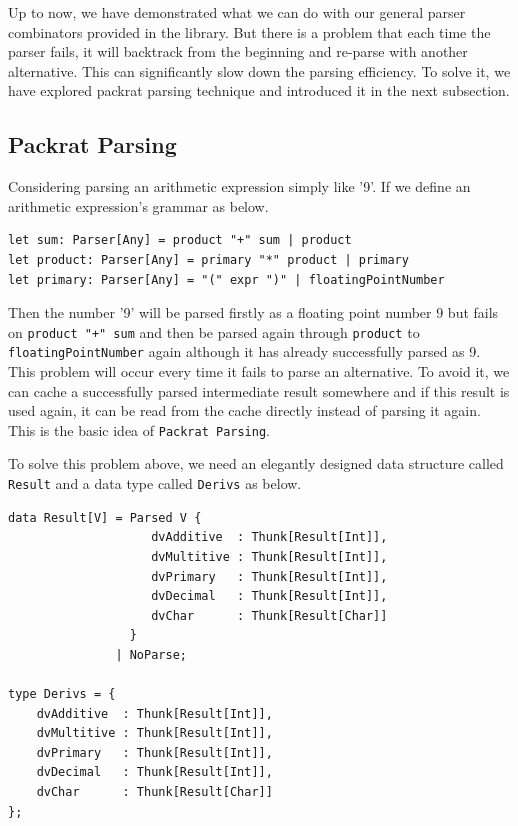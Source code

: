 Up to now, we have demonstrated what we can do with our general parser combinators provided in the library. But there is a problem that each time the parser fails, it will backtrack from the beginning and re-parse with another alternative. This can significantly slow down the parsing efficiency. To solve it, we have explored packrat parsing technique and introduced it in the next subsection.

\subsection{Packrat Parsing}
Considering parsing an arithmetic expression simply like '9'. If we define an arithmetic expression's grammar as below.

\begin{lstlisting}
let sum: Parser[Any] = product "+" sum | product
let product: Parser[Any] = primary "*" product | primary
let primary: Parser[Any] = "(" expr ")" | floatingPointNumber
\end{lstlisting}

Then the number '9' will be parsed firstly as a floating point number 9 but fails on \texttt{product "+" sum} and then be parsed again through \texttt{product} to \texttt{floatingPointNumber} again although it has already successfully parsed as 9. This problem will occur every time it fails to parse an alternative. To avoid it, we can cache a successfully parsed intermediate result somewhere and if this result is used again, it can be read from the cache directly instead of parsing it again. This is the basic idea of \texttt{Packrat Parsing}.

To solve this problem above, we need an elegantly designed data structure called \texttt{Result} and a data type called \texttt{Derivs} as below.

\begin{lstlisting}
data Result[V] = Parsed V {
                    dvAdditive  : Thunk[Result[Int]],
                    dvMultitive : Thunk[Result[Int]],
                    dvPrimary   : Thunk[Result[Int]],
                    dvDecimal   : Thunk[Result[Int]],
                    dvChar      : Thunk[Result[Char]]
                 }
               | NoParse;

type Derivs = {
    dvAdditive  : Thunk[Result[Int]],
    dvMultitive : Thunk[Result[Int]],
    dvPrimary   : Thunk[Result[Int]],
    dvDecimal   : Thunk[Result[Int]],
    dvChar      : Thunk[Result[Char]]
};
\end{lstlisting}

